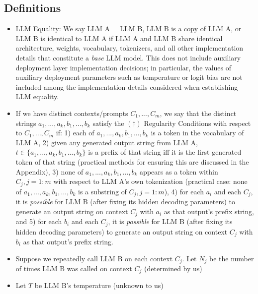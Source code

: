 \documentclass{article}
\begin{document}
\subsection{Definitions}
\begin{itemize}
\item LLM Equality: We say LLM A = LLM B, LLM B is a copy of LLM A, or LLM B is identical to LLM A if LLM A and LLM B share identical architecture, weights, vocabulary, tokenizers, and all other implementation details that constitute a \textit{base} LLM model. This does not include auxiliary deployment layer implementation decisions; in particular, the values of auxiliary deployment parameters such as temperature or logit bias are not included among the implementation details considered when establishing LLM equality.
\item If we have distinct contexts/prompts $\displaystyle C_{1} ,...,C_{m}$, we say that the distinct strings $\displaystyle a_{1} ,...,a_{k} ,b_{1} ,...,b_{k}$ satisfy the $\displaystyle ( \dagger )$ Regularity Conditions with respect to $\displaystyle C_{1} ,...,C_{m}$ if: 1) each of $\displaystyle a_{1} ,...,a_{k} ,b_{1} ,...,b_{k}$ is a token in the vocabulary of LLM A, 2) given any generated output string from LLM A, $\displaystyle t\in \{a_{1} ,...,a_{k} ,b_{1} ,...,b_{k}\}$ is a prefix of that string iff it is the first generated token of that string (practical methods for ensuring this are discussed in the Appendix), 3) none of $\displaystyle a_{1} ,...,a_{k} ,b_{1} ,...,b_{k}$ appears as a token within $\displaystyle C_{j} ,j=1:m$ with respect to LLM A's own tokenization (practical case: none of $\displaystyle a_{1} ,...,a_{k} ,b_{1} ,...,b_{k}$ is a substring of $\displaystyle C_{j} ,j=1:m$), 4) for each $\displaystyle a_{i}$ and each $\displaystyle C_{j}$, it is \textit{possible} for LLM B (after fixing its hidden decoding parameters) to generate an output string on context $\displaystyle C_{j}$ with $\displaystyle a_{i}$ as that output's prefix string, and 5) for each $\displaystyle b_{i}$ and each $\displaystyle C_{j}$, it is \textit{possible} for LLM B (after fixing its hidden decoding parameters) to generate an output string on context $\displaystyle C_{j}$ with $\displaystyle b_{i}$ as that output's prefix string.
\item Suppose we repeatedly call LLM B on each context $\displaystyle C_{j}$. Let $\displaystyle N_{j}$ be the number of times LLM B was called on context $\displaystyle C_{j}$ (determined by us)
\item Let $\displaystyle T$ be LLM B's temperature (unknown to us)

\end{itemize}
\end{document}
